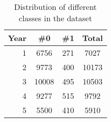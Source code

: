 \begin{table}[H]
\centering
\begin{tabular}[H]{r|cc|c}
     \textbf{Year} & \textbf{\#0} & \textbf{\#1} &\textbf{Total}  \\
     \hline
     1 & 6756 & 271 & 7027 \\
     2 & 9773 & 400 & 10173 \\
     3 & 10008 & 495 & 10503 \\
     4 & 9277 & 515 & 9792 \\
     5 & 5500 & 410 & 5910 \\
\end{tabular}
\caption{\label{tab::dataset_class_distr} Distribution of different classes in the dataset}
\end{table}

